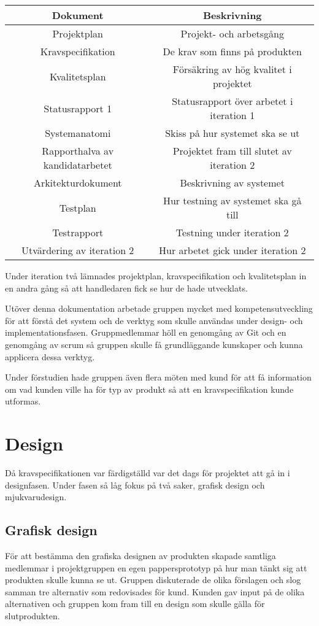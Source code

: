 \begin{center}
\begin{tabular}{|c|c|}
\hline
\textbf{Dokument} & \textbf{Beskrivning} \\
\hline
Projektplan & Projekt- och arbetsgång \\
\hline
Kravspecifikation & De krav som finns på produkten \\
\hline
Kvalitetsplan & Försäkring av hög kvalitet i projektet \\
\hline
Statusrapport 1 & Statusrapport över arbetet i iteration 1 \\
\hline
Systemanatomi & Skiss på hur systemet ska se ut \\
\hline
Rapporthalva av kandidatarbetet & Projektet fram till slutet av iteration 2 \\
\hline
Arkitekturdokument & Beskrivning av systemet \\
\hline
Testplan & Hur testning av systemet ska gå till \\
\hline
Testrapport & Testning under iteration 2 \\
\hline
Utvärdering av iteration 2 & Hur arbetet gick under iteration 2 \\
\hline
\end{tabular}
\end{center}

Under iteration två lämnades projektplan, kravspecifikation och kvalitetsplan in en andra gång så att handledaren fick se hur de hade utvecklats.

Utöver denna dokumentation arbetade gruppen mycket med kompetensutveckling för att förstå det system och de verktyg som skulle användas under design- och implementationsfasen. Gruppmedlemmar höll en genomgång av Git och en genomgång av scrum så gruppen skulle få grundläggande kunskaper och kunna applicera dessa verktyg.

Under förstudien hade gruppen även flera möten med kund för att få information om vad kunden ville ha för typ av produkt så att en kravspecifikation kunde utformas.

\section{Design}
Då kravspecifikationen var färdigställd var det dags för projektet att gå in i designfasen. Under fasen så låg fokus på två saker, grafisk design och mjukvarudesign.

\subsection{Grafisk design}
För att bestämma den grafiska designen av produkten skapade samtliga medlemmar i projektgruppen en egen pappersprototyp på hur man tänkt sig att produkten skulle kunna se ut. Gruppen diskuterade de olika förslagen och slog samman tre alternativ som redovisades för kund. Kunden gav input på de olika alternativen och gruppen kom fram till en design som skulle gälla för slutprodukten.

